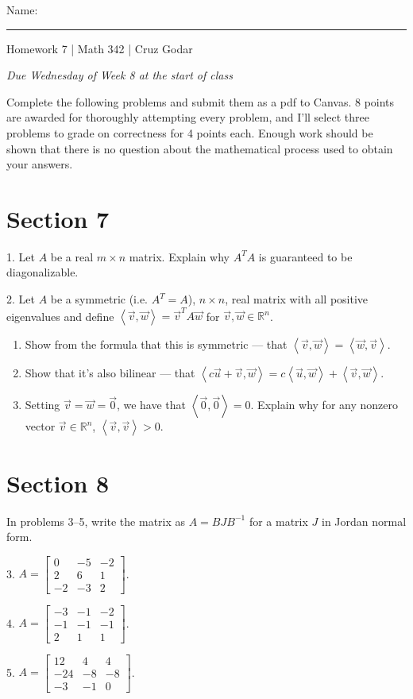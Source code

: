 \documentclass{article}
\begin{document}
\Large Name: \rule{2in}{0.15mm} \hfill Homework 7 | Math 342 | Cruz Godar \vspace{4pt} \normalsize

\textit{Due Wednesday of Week 8 at the start of class}

Complete the following problems and submit them as a pdf to Canvas. 8 points are awarded for thoroughly attempting every problem, and I'll select three problems to grade on correctness for 4 points each. Enough work should be shown that there is no question about the mathematical process used to obtain your answers.

\section{Section 7}

1. Let $A$ be a real $m \times n$ matrix. Explain why $A^T\!A$ is guaranteed to be diagonalizable.

2. Let $A$ be a symmetric (i.e. $A^T = A$), $n \times n$, real matrix with all positive eigenvalues and define $\left< \vec{v}, \vec{w} \right> = \vec{v}^T A \vec{w}$ for $\vec{v}, \vec{w} \in \mathbb{R}^n$.

\begin{enumerate}

	\item Show from the formula that this is symmetric --- that $\left< \vec{v}, \vec{w} \right> = \left< \vec{w}, \vec{v} \right>$.

	\item Show that it's also bilinear --- that $\left< c\vec{u} + \vec{v}, \vec{w} \right> = c\left< \vec{u}, \vec{w} \right> + \left< \vec{v}, \vec{w} \right>$.

	\item Setting $\vec{v} = \vec{w} = \vec{0}$, we have that $\left< \vec{0}, \vec{0} \right> = 0$. Explain why for any nonzero vector $\vec{v} \in \mathbb{R}^n$, $\left< \vec{v}, \vec{v} \right> > 0$.

\end{enumerate}

\section{Section 8}

In problems 3--5, write the matrix as $A = BJB^{-1}$ for a matrix $J$ in Jordan normal form.

3. $A = \left[\begin{array}{ccc} 0& -5& -2 \\ 2& 6& 1 \\ -2& -3& 2 \end{array}\right]$.

4. $A = \left[\begin{array}{ccc} -3& -1& -2 \\ -1& -1& -1 \\ 2& 1& 1 \end{array}\right]$.

5. $A = \left[\begin{array}{ccc} 12& 4& 4 \\ -24& -8& -8 \\ -3& -1& 0 \end{array}\right]$.
\end{document}
